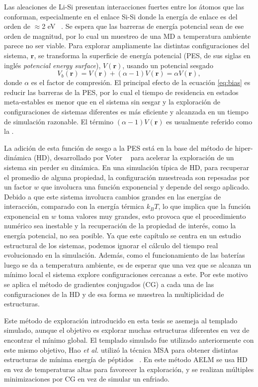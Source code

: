 Las aleaciones de Li-Si presentan interacciones fuertes entre los átomos que las
conforman, especialmente en el enlace Si-Si donde la energía de enlace es del
orden de $\approx$2 eV ~\cite{wypych2018handbook}. Se espera que las barreras de 
energía potencial sean de ese orden de magnitud, por lo cual un 
muestreo de una MD a temperatura ambiente parece no ser viable. Para explorar 
ampliamente las distintas configuraciones del sistema, $\mathbf{r}$, se 
transforma la superficie de energía potencial (PES, de sus siglas en inglés 
\textit{potencial energy surface}), $V(\mathbf{r})$, usando un potencial sesgado
\begin{equation}\label{eq:bias}
    V_b(\mathbf{r}) = V(\mathbf{r}) + (\alpha - 1) V(\mathbf{r}) = \alpha V(\mathbf{r}),
\end{equation}
donde $\alpha$ es el factor de compresión. El principal efecto de la ecuación 
\ref{eq:bias} es reducir las barreras de la PES, por lo cual el tiempo de
residencia en estados meta-estables es menor que en el sistema sin sesgar y la 
exploración de configuraciones de sistemas diferentes es más eficiente y 
alcanzada en un tiempo de simulación razonable. El término 
$(\alpha - 1) V(\mathbf{r})$ es usualmente referido como la 
.

La adición de esta función de sesgo a la PES está en la base del método de 
hiper-dinámica (HD), desarrollado por Voter ~\cite{voter1997HD,voter1997method} 
para acelerar la exploración de un sistema sin perder su dinámica. En una 
simulación típica de HD, para recuperar el promedio de alguna propiedad, la 
configuración muestreada son repesadas por un factor $w$ que involucra una función
exponencial y depende del sesgo aplicado. Debido a que este sistema involucra 
cambios grandes en las energías de interacción, comparado con la energía térmica
$k_BT$, lo que implica que la función exponencial en $w$ toma valores muy grandes,
esto provoca que el procedimiento numérico sea inestable y la recuperación de 
la propiedad de interés, como la energía potencial, no sea posible. Ya que este
capítulo se centra en un estudio estructural de los sistemas, podemos ignorar
el cálculo del tiempo real evolucionado en la simulación. Además, como el 
funcionamiento de las baterías luego se da a temperatura ambiente, es de esperar
que una vez que se alcanza un mínimo local el sistema explore configuraciones
cercanas a este. Por este motivo se aplica el método de gradientes conjugados (CG)
a cada una de las configuraciones de la HD y de esa forma se muestrea la 
multiplicidad de estructuras.

Este método de exploración introducido en esta tesis se asemeja al templado
simulado, aunque el objetivo es explorar muchas estructuras diferentes en vez de 
encontrar el mínimo global. El templado simulado fue utilizado anteriormente
con este mismo objetivo, Hao \textit{et al.} utilizó la técnica MSA para obtener
distintas estructuras de mínima energía de péptidos ~\cite{hao2015}. En este 
método AELM se usa HD en vez de temperaturas altas para favorecer la exploración,
y se realizan múltiples minimizaciones por CG en vez de simular un enfriado. 
